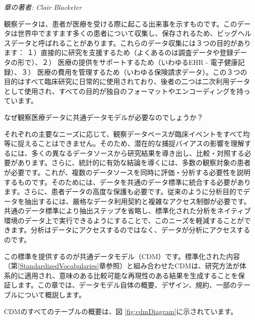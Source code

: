 \documentclass[
  11pt]{book}
\theoremstyle{definition}
\theoremstyle{definition}
\theoremstyle{definition}
\theoremstyle{definition}
\theoremstyle{remark}
\begin{document}
\emph{章の著者: Clair Blacketer}

観察データは、患者が医療を受ける際に起こる出来事を示すものです。このデータは世界中でますます多くの患者について収集し、保存されるため、ビッグヘルスデータと呼ばれることがあります。これらのデータ収集には３つの目的があります： １）直接的に研究を支援するため（よくあるのは調査データや登録データの形で）、２） 医療の提供をサポートするため（いわゆるEHR - 電子健康記録）、３） 医療の費用を管理するため（いわゆる保険請求データ）。この３つの目的はすべて臨床研究に日常的に使用されており、後者の二つは二次利用データとして使用され、すべての目的が独自のフォーマットやエンコーディングを持っています。   

なぜ観察医療データに共通データモデルが必要なのでしょうか？

それぞれの主要なニーズに応じて、観察データベースが臨床イベントをすべて均等に捉えることはできません。そのため、潜在的な捕捉バイアスの影響を理解するには、多くの異なるデータソースから研究結果を導き出し、比較・対照する必要があります。さらに、統計的に有効な結論を導くには、多数の観察対象の患者が必要です。これが、複数のデータソースを同時に評価・分析する必要性を説明するものです。そのためには、データを共通のデータ標準に統合する必要があります。さらに、患者データの高度な保護も必要です。従来のように分析目的でデータを抽出するには、厳格なデータ利用契約と複雑なアクセス制御が必要です。共通のデータ標準により抽出ステップを省略し、標準化された分析をネイティブ環境のデータ上で実行できるようにすることで、このニーズを軽減することができます。分析はデータにアクセスするのではなく、データが分析にアクセスするのです。

この標準を提供するのが共通データモデル（CDM）です。標準化された内容（第\ref{StandardizedVocabularies}章参照）と組み合わせたCDMは、研究方法が体系的に適用され、意味のある比較可能な再現性のある結果を生成することを保証します。この章では、データモデル自体の概要、デザイン、規約、一部のテーブルについて概説します。

CDMのすべてのテーブルの概要は、図 \ref{fig:cdmDiagram}に示されています。 
\end{document}
